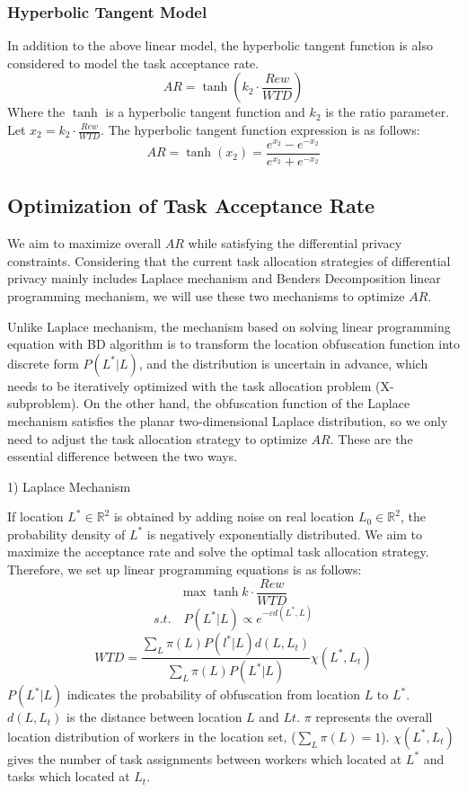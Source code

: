 \subsubsection{Hyperbolic Tangent Model}
In addition to the above linear model, the hyperbolic tangent function is also considered to model the task acceptance rate.
$$
	AR=\tanh (k_2 \cdot \frac{Rew}{WTD})
$$
Where the $\tanh$ is a hyperbolic tangent function and $k_2$ is the ratio parameter. Let $x_2=k_2 \cdot \frac{Rew}{WTD}$. The hyperbolic tangent function expression is as follows:
$$
	AR=\tanh (x_2)=\frac{e^{x_2}-e^{-x_2}}{e^{x_2}+e^{-x_2}}
$$

\subsection{Optimization of Task Acceptance Rate} %
We aim to maximize overall $AR$ while satisfying the differential privacy constraints. Considering that the current task allocation strategies of differential privacy mainly includes Laplace mechanism and Benders Decomposition linear programming mechanism, we will use these two mechanisms to optimize $AR$.

Unlike Laplace mechanism, the mechanism based on solving linear programming equation with BD algorithm is to transform the location obfuscation function into discrete form $P(L^*|L)$, and the distribution is uncertain in advance, which needs to be iteratively optimized with the task allocation problem (X-subproblem). On the other hand, the obfuscation function of the Laplace mechanism satisfies the planar two-dimensional Laplace distribution, so we only need to adjust the task allocation strategy to optimize $AR$. These are the essential difference between the two ways.

1) Laplace Mechanism

If location $L^* \in \mathbb R^2$ is obtained by adding noise on real location $L_0 \in \mathbb R^2$, the probability density of $L^*$ is negatively exponentially distributed. We aim to maximize the acceptance rate and solve the optimal task allocation strategy. Therefore, we set up linear programming equations is as follows:
$$
	\max \tanh {k \cdot \frac{Rew}{WTD}}
$$
$$
	s.t. \quad P(L^*|L) \propto e^{-\varepsilon d(L^*,L)}
$$
$$
	WTD=\frac {\sum_L \pi(L) P(l^*|L) d(L,L_t)} {\sum_L \pi(L) P(L^*|L)} \chi(L^*,L_t)
$$
$P(L^*|L)$ indicates the probability of obfuscation from location $L$ to $L^*$. $d(L,L_t)$ is the distance between location $L$ and $Lt$. $\pi$ represents the overall location distribution of workers in the location set, ($\sum_L \pi(L)=1$). $\chi(L^*,L_t)$ gives the number of task assignments between workers which located at $L^*$ and tasks which located at $L_t$. 


